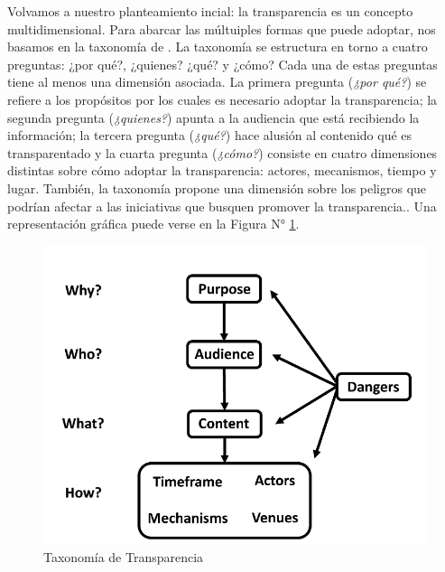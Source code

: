 \documentclass[
]{book}
\begin{document}
Volvamos a nuestro planteamiento incial: la transparencia es un concepto multidimensional. Para abarcar las múltuiples formas que puede adoptar, nos basamos en la taxonomía de \citet{elliott_Taxonomy_2020}. La taxonomía se estructura en torno a cuatro preguntas: ¿por qué?, ¿quienes? ¿qué? y ¿cómo? Cada una de estas preguntas tiene al menos una dimensión asociada. La primera pregunta (\emph{¿por qué?}) se refiere a los propósitos por los cuales es necesario adoptar la transparencia; la segunda pregunta (\emph{¿quienes?}) apunta a la audiencia que está recibiendo la información; la tercera pregunta (\emph{¿qué?}) hace alusión al contenido qué es transparentado y la cuarta pregunta (\emph{¿cómo?}) consiste en cuatro dimensiones distintas sobre cómo adoptar la transparencia: actores, mecanismos, tiempo y lugar. También, la taxonomía propone una dimensión sobre los peligros que podrían afectar a las iniciativas que busquen promover la transparencia.. Una representación gráfica puede verse en la Figura N° \ref{fig:taxonomy}.

\begin{figure}[H]

{\centering \includegraphics[width=1\linewidth]{docs/images/taxonomy} 

}

\caption{Taxonomía de Transparencia}\label{fig:taxonomy}
\end{figure}
\end{document}
